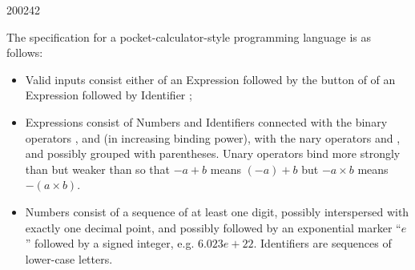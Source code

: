 \documentclass[10pt,\jkfside,a4paper]{article}
\begin{document}
\begin{examquestion}{2002}{4}{2}

The specification for a pocket-calculator-style programming language is as 
follows:

\begin{itemize}

\item Valid inputs consist either of an Expression followed by the
 button of of an Expression followed by 
Identifier ;

\item Expressions consist of Numbers and Identifiers connected with the
binary operators \framebox{$+$}, \framebox{$\times$} and
\framebox{$\uparrow$} (in increasing binding power), with the nary operators
\framebox{$-$} and , and possibly grouped with parentheses.
Unary operators bind more strongly than \framebox{$+$} but weaker than
\framebox{$\times$} so that $-a + b$ means $(-a) + b$ but $-a \times b$
means $-(a \times b)$.

\item Numbers consist of a sequence of at least one digit, possibly
interspersed with exactly one decimal point, and possibly followed by an
exponential marker ``$e$'' followed by a signed integer, e.g. $6.023e+22$.
Identifiers are sequences of lower-case letters.

\end{itemize}

\begin{enumerate}

\newcommand{\Start}{\mathbf{Start}}
\newcommand{\Unary}{\mathbf{Unary}}
\newcommand{\OptExpression}{\mathbf{OptExpression}}
\newcommand{\Expression}{\mathbf{Expression}}
\newcommand{\Times}{\mathbf{Times}}
\newcommand{\OptTimes}{\mathbf{OptTimes}}
\newcommand{\Arrow}{\mathbf{Arrow}}
\newcommand{\OptArrow}{\mathbf{OptArrow}}
\newcommand{\Value}{\mathbf{Value}}
\newcommand{\Identifier}{\mathbf{Identifier}}
\newcommand{\OptIdentifier}{\mathbf{OptIdentifier}}
\newcommand{\Letter}{\mathbf{Letter}}
\newcommand{\Number}{\mathbf{Number}}
\newcommand{\Int}{\mathbf{Int}}
\newcommand{\OptInt}{\mathbf{OptInt}}
\newcommand{\OptDecimal}{\mathbf{OptDecimal}}
\newcommand{\OptSuffix}{\mathbf{OptSuffix}}
\newcommand{\Sign}{\mathbf{Sign}}


\end{enumerate}
\end{examquestion}
\end{document}
